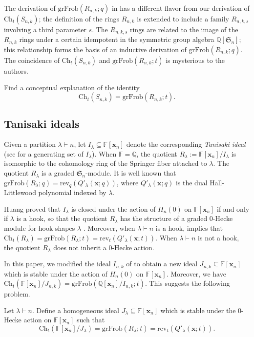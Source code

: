 \documentclass[ALCO,ThmDefs,published]{cedram}
\newcommand{\symm}{{\mathfrak{S}}}
\newcommand{\QQ}{{\mathbb {Q}}}
\newcommand{\xx}{{\mathbf {x}}}
\newcommand{\FF}{{\mathbb{F}}}
\theoremstyle{plain}
\newcommand{\grFrob}{{\mathrm {grFrob}}}
\newcommand{\rev}{{\mathrm {rev}}}
\newcommand{\Ch}{{\mathrm {Ch}}}
\newcommand{\symm}{{\mathfrak{S}}}
\newcommand{\QQ}{{\mathbb {Q}}}
\newcommand{\FF}{{\mathbb{F}}}
\newcommand{\xx}{{\mathbf {x}}}
\begin{document}
The derivation of $\grFrob(R_{n,k};q)$ in \cite{HRS} has a different flavor from our derivation of 
$\Ch_t(S_{n,k})$; the definition of the rings $R_{n,k}$ is extended to include a family 
$R_{n,k,s}$ involving a third parameter $s$.  The $R_{n,k,s}$ rings are related to the image of the $R_{n,k}$
rings under a certain idempotent in the symmetric group algebra $\QQ[\symm_n]$; this relationship forms 
the basis of an inductive derivation of $\grFrob(R_{n,k};q)$.
The coincidence of $\Ch_t(S_{n,k})$ and $\grFrob(R_{n,k};t)$ is mysterious to the authors.

\begin{problem}
Find a conceptual explanation of the identity
\[
\Ch_t(S_{n,k}) = \grFrob(R_{n,k};t).
\]
\end{problem}

\subsection{Tanisaki ideals}
Given a partition $\lambda \vdash n$, let $I_{\lambda} \subseteq \FF[\xx_n]$ denote the corresponding 
\emph{Tanisaki ideal} (see \cite{GP} for a generating set of $I_{\lambda}$).
When $\FF = \QQ$, the quotient $R_{\lambda} := {\FF[\xx_n]} / {I_{\lambda}}$ is isomorphic to the 
cohomology ring of the Springer fiber attached to $\lambda$.
The quotient $R_{\lambda}$ is a graded $\symm_n$-module.
It is well known \cite{GP} that $\grFrob(R_{\lambda};q) = \rev_q( Q'_{\lambda}(\xx;q))$, where
$Q'_{\lambda}(\xx;q)$ is the dual Hall-Littlewood polynomial indexed by $\lambda$.

Huang proved that $I_{\lambda}$ is closed under the action of $H_n(0)$
on $\FF[\xx_n]$ if and only if $\lambda$ is a hook, 
so that the quotient $R_{\lambda}$ has the structure of a graded 0-Hecke module for hook shapes $\lambda$
\cite[Prop. 8.2]{Huang}.
Moreover, when $\lambda \vdash n$ is a hook, \cite[Cor. 8.4]{Huang} implies that 
$\Ch_t(R_{\lambda}) = \grFrob(R_{\lambda}; t) = \rev_t (Q'_{\lambda}(\xx;t))$.
When $\lambda \vdash n$ is not a hook, the quotient $R_{\lambda}$ does not inherit a 
0-Hecke action.  

In this paper, we modified the ideal $I_{n,k}$ of \cite{HRS} to obtain a new ideal $J_{n,k} \subseteq \FF[\xx_n]$
which is stable under the action of $H_n(0)$ on $\FF[\xx_n]$.  Moreover, we have
$\Ch_t \left( {\FF[\xx_n]} / {J_{n,k}} \right) = \grFrob \left( {\QQ[\xx_n]} / {I_{n,k}}; t \right)$.
This suggests the following problem.

\begin{problem}
\label{tanisaki-problem}
Let $\lambda \vdash n$.  Define a homogeneous ideal $J_{\lambda} \subseteq \FF[\xx_n]$ which is stable under the 
0-Hecke action on $\FF[\xx_n]$ such that
\begin{equation}
\Ch_t \left( {\FF[\xx_n]} / {J_{\lambda}} \right) = \grFrob(R_{\lambda};t) = \rev_t(Q'_{\lambda}(\xx;t)).
\end{equation}
\end{problem}
\end{document}
